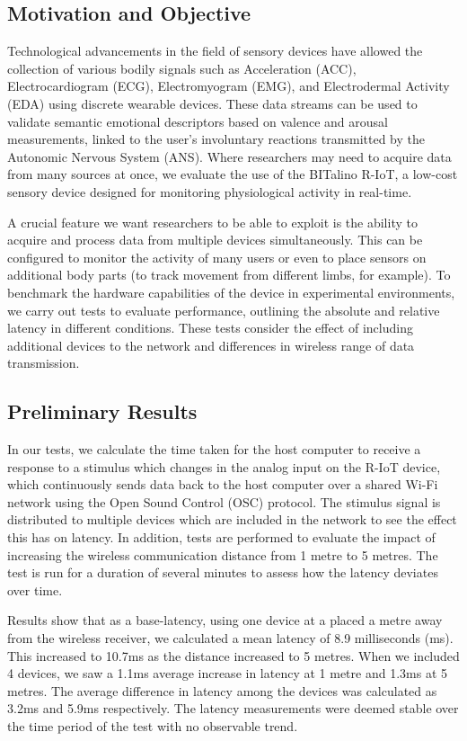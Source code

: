 \subsection{Motivation and Objective}

Technological advancements in the field of sensory devices have allowed the collection of various bodily signals such as Acceleration (ACC), Electrocardiogram (ECG), Electromyogram (EMG), and Electrodermal Activity (EDA) using discrete wearable devices. These data streams can be used to validate semantic emotional descriptors based on valence and arousal measurements, linked to the user’s involuntary reactions transmitted by the Autonomic Nervous System (ANS). Where researchers may need to acquire data from many sources at once, we evaluate the use of the BITalino R-IoT, a low-cost sensory device designed for monitoring physiological activity in real-time.

A crucial feature we want researchers to be able to exploit is the ability to acquire and process data from multiple devices simultaneously. This can be configured to monitor the activity of many users or even to place sensors on additional body parts (to track movement from different limbs, for example). To benchmark the hardware capabilities of the device in experimental environments, we carry out tests to evaluate performance, outlining the absolute and relative latency in different conditions. These tests consider the effect of including additional devices to the network and differences in wireless range of data transmission.

\subsection{Preliminary Results}

In our tests, we calculate the time taken for the host computer to receive a response to a stimulus which changes in the analog input on the R-IoT device, which continuously sends data back to the host computer over a shared Wi-Fi network using the Open Sound Control (OSC) protocol. The stimulus signal is distributed to multiple devices which are included in the network to see the effect this has on latency. In addition, tests are performed to evaluate the impact of increasing the wireless communication distance from 1 metre to 5 metres. The test is run for a duration of several minutes to assess how the latency deviates over time.

Results show that as a base-latency, using one device at a placed a metre away from the wireless receiver, we calculated a mean latency of 8.9 milliseconds (ms). This increased to 10.7ms as the distance increased to 5 metres. When we included 4 devices, we saw a 1.1ms average increase in latency at 1 metre and 1.3ms at 5 metres. The average difference in latency among the devices was calculated as 3.2ms and 5.9ms respectively. The latency measurements were deemed stable over the time period of the test with no observable trend.

